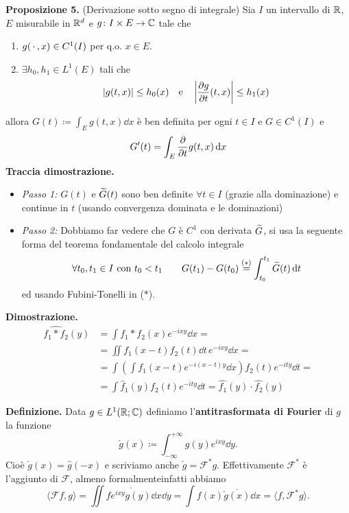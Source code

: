 \textbf{Proposizione 5.} (Derivazione sotto segno di integrale)
Sia $I$ un intervallo di $\mathbb R$, $E$ misurabile in $\mathbb R^d$ e $g \colon I \times E \to \mathbb C$ tale che
\begin{enumerate}
	\item $g(\,\cdot\,, x) \in C^1(I)$ per q.o. $x \in E$.
	\item $\exists h_0, h_1 \in L^1(E)$ tali che
		$$
		|g(t, x)| \leq h_0(x) 
		\quad
		\text{e}
		\quad
		\left|\frac{\partial g}{\partial t}(t, x)\right| \leq h_1(x)
		$$
\end{enumerate}
allora $G(t) \coloneqq \int_E g(t, x) \dd x$ è ben definita per ogni $t \in I$ e $G \in C^1(I)$ e
$$
G'(t) = \int_E \frac{\partial}{\partial t}g(t, x) \,\mathrm{d} x
$$
\textbf{Traccia dimostrazione.}
\begin{itemize}
	\item \textit{Passo 1:} $G(t)$ e $\widetilde G(t)$ sono ben definite $\forall t \in I$ (grazie alla dominazione) e continue in $t$ (usando convergenza dominata e le dominazioni)
	\item \textit{Passo 2:} Dobbiamo far vedere che $G$ è $C^1$ con derivata $\widetilde G$, si usa la seguente forma del teorema fondamentale del calcolo integrale
		$$
		\forall t_0, t_1 \in I \text{ con } t_0 < t_1
		\qquad
		G(t_1) - G(t_0) \overset{(*)}{=} \int_{t_0}^{t_1} \widetilde G(t) \,\mathrm{d} t
		$$
		ed usando Fubini-Tonelli in ($*$).
\end{itemize}


\textbf{Dimostrazione.}
$$
\begin{aligned}
	\hat{f_1 \ast f_2}(y)
	&= \int f_1 \ast f_2 (x) e^{-ixy} \dd x = \\
	&= \iint f_1(x - t) f_2(t) \dd t \, e^{-ixy} \dd x = \\
	&= \int \left(\int f_1(x - t) e^{-i(x - t)y} \dd x \right) f_2(t) e^{-ity} \dd t = \\
	&= \int \hat f_1(y) f_2(t) e^{-ity} \dd t = \hat{f_1}(y) \cdot \hat{f_2}(y)
\end{aligned}
$$

\textbf{Definizione.}
Data $g \in L^1(\mathbb R; \mathbb C)$ definiamo l'\textbf{antitrasformata di Fourier} di $g$ la funzione
$$
	\check g(x) \coloneqq \int_{-\infty}^{+\infty} g(y) e^{ixy} \dd y.
$$
Cioè $\check g(x) = \hat g(-x)$ e scriviamo anche $\check g = \mathcal F^* g$. Effettivamente $\mathcal F^*$ è l'aggiunto di $\mathcal F$, almeno formalmente\footnotemark infatti abbiamo
$$
	\langle \mathcal F f, g \rangle
	= \iint f \overline{e^{ixy} g(y)} \dd x \dd y
	= \int f(x) \overline{\check g(x)} \dd x
	= \langle f, \mathcal F^* g \rangle.
$$

